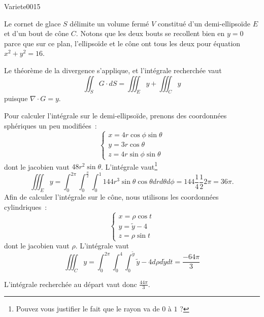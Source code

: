 
\begin{corrige}{Variete0015}

Le cornet de glace $S$ délimite un volume fermé $V$ constitué d'un demi-ellipsoïde $E$ et d'un bout de cône $C$. Notons que les deux bouts se recollent bien en $y=0$ parce que sur ce plan, l'ellipsoïde et le cône ont tous les deux pour équation  $x^2+y^2=16$.

Le théorème de la divergence s'applique, et l'intégrale recherchée vaut
\begin{equation*}
  \iint_S G \cdot d S = \iiint_E y + \iiint_C y
\end{equation*}
puisque $\nabla\cdot G = y$.

Pour calculer l'intégrale sur le demi-ellipsoïde, prenons des coordonnées sphériques un peu modifiées~:
\begin{equation*}
  \begin{cases}
    x = 4 r \cos \phi \sin \theta\\
    y = 3 r \cos \theta\\
    z = 4 r \sin \phi \sin \theta
  \end{cases}
\end{equation*}
dont le jacobien vaut $48 r^2 \sin \theta$. L'intégrale vaut\footnote{Pouvez vous justifier le fait que le rayon va de $0$ à $1$ ?}
\begin{equation*}
  \iiint_E y = %
  \int_0^{2\pi} \int_0^{\frac\pi2} \int_0^1 144 r^3 \sin\theta\cos\theta%
  d r d \theta d \phi =%
  144 \frac 14 \frac 12 2 \pi = 36 \pi.
\end{equation*}
Afin de calculer l'intégrale sur le cône, nous utilisons les coordonnées cylindriques~:
\begin{equation*}
  \begin{cases}
    x = \rho \cos t\\
    y = \tilde y - 4\\
    z = \rho \sin t
  \end{cases}
\end{equation*}
dont le jacobien vaut $\rho$. L'intégrale vaut
\begin{equation*}
  \iiint_C y = \int_0^{2\pi} \int_0^4 \int_0^{\tilde y} \tilde y - 4
  d\rho d\tilde yd t = \frac{- 64 \pi}{3}
\end{equation*}

L'intégrale recherchée au départ vaut donc \begin{math}
  \frac {44 \pi}3
\end{math}.

\end{corrige}
